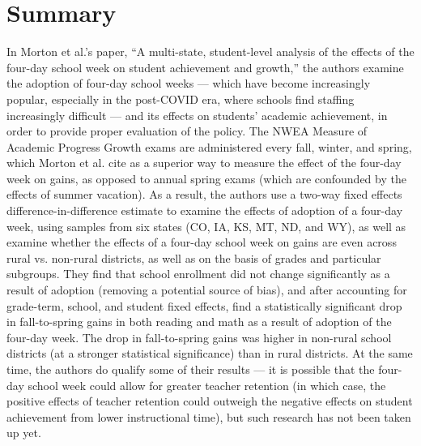 \documentclass[10pt]{extarticle}
\title{}
\author{}
\date{}
\begin{document}
  \section{Summary}%
  In Morton et al.'s paper, ``A multi-state, student-level analysis of the effects of the four-day school week on student achievement and growth,'' the authors examine the adoption of four-day school weeks --- which have become increasingly popular, especially in the post-COVID era, where schools find staffing increasingly difficult --- and its effects on students' academic achievement, in order to provide proper evaluation of the policy. The NWEA Measure of Academic Progress Growth exams are administered every fall, winter, and spring, which Morton et al. cite as a superior way to measure the effect of the four-day week on gains, as opposed to annual spring exams (which are confounded by the effects of summer vacation). As a result, the authors use a two-way fixed effects difference-in-difference estimate to examine the effects of adoption of a four-day week, using samples from six states (CO, IA, KS, MT, ND, and WY), as well as examine whether the effects of a four-day school week on gains are even across rural vs. non-rural districts, as well as on the basis of grades and particular subgroups. They find that school enrollment did not change significantly as a result of adoption (removing a potential source of bias), and after accounting for grade-term, school, and student fixed effects, find a statistically significant drop in fall-to-spring gains in both reading and math as a result of adoption of the four-day week. The drop in fall-to-spring gains was higher in non-rural school districts (at a stronger statistical significance) than in rural districts. At the same time, the authors do qualify some of their results --- it is possible that the four-day school week could allow for greater teacher retention (in which case, the positive effects of teacher retention could outweigh the negative effects on student achievement from lower instructional time), but such research has not been taken up yet.
\end{document}
